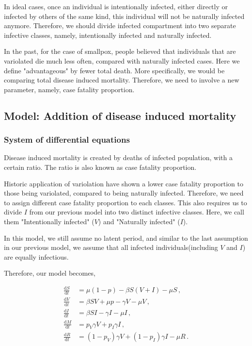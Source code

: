 \documentclass[12pt]{article}
\newcommand\dbyd[2]{\frac{\mathrm d{#1}}{\mathrm d{#2}}}
\newcommand{\pmV}{p_{V}}
\newcommand{\pmI}{p_{I}}
\begin{document}
In ideal cases, once an individual is intentionally infected, either directly or infected by others of the same kind, this individual will not be naturally infected anymore. Therefore, we should divide infected compartment into two separate infective classes, namely, intentionally infected and naturally infected.

In the past, for the case of smallpox, people believed that individuals that are variolated die much less often, compared with naturally infected cases. Here we define "advantageous" by fewer total death. More specifically, we would be comparing total disease induced mortality. Therefore, we need to involve a new parameter, namely, case fatality proportion.

\subsection{Model: Addition of disease induced mortality}\label{Newborn section}
\subsubsection{System of differential equations}
Disease induced mortality is created by deaths of infected population, with a certain ratio. The ratio is also known as case fatality proportion. 

Historic application of variolation have shown a lower case fatality proportion to those being variolated, compared to being naturally infected. Therefore, we need to assign different case fatality proportion to each classes. This also requires us to divide $I$ from our previous model into two distinct infective classes. Here, we call them "Intentionally infected" ($V$) and "Naturally infected" ($I$). 

In this model, we still assume no latent period, and similar to the last assumption in our previous model, we assume that all infected individuals(including $V$ and $I$) are equally infectious.

Therefore, our model becomes,
\begin{linenomath*}
\begin{equation}\label{2}
\begin{split}
\dbyd{S}{t}&=\mu(1-p)- \beta S(V+I)-\mu S \,,\\
\dbyd{V}{t}&=\beta SV+\mu p-\gamma V -\mu V\,,\\
\dbyd{I}{t}&=\beta SI-\gamma I -\mu I\,,\\
\dbyd{M}{t}&=\pmV\gamma V+\pmI\gamma I\,,\\
\dbyd{R}{t}&=(1-\pmV)\gamma V+(1-\pmI)\gamma I-\mu R\,.
\end{split}
\end{equation}
\end{linenomath*}
\end{document}
